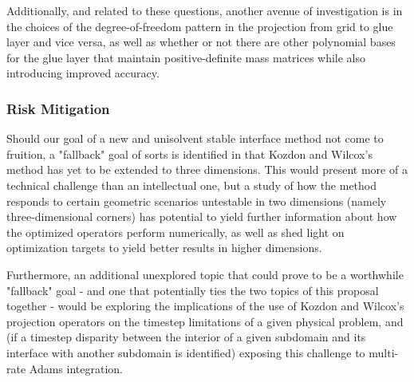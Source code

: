 Additionally, and related to these questions, another avenue of investigation
is in the choices of the degree-of-freedom pattern in the projection from
grid to glue layer and vice versa, as well as whether or not there are other
polynomial bases for the glue layer that maintain positive-definite mass
matrices while also introducing improved accuracy.

\subsubsection{Risk Mitigation}

Should our goal of a new and unisolvent stable interface method not come to
fruition, a "fallback" goal of sorts is identified in that Kozdon and Wilcox's
method has yet to be extended to three dimensions. This would present more of a
technical challenge than an intellectual one, but a study of how the method
responds to certain geometric scenarios untestable in two dimensions (namely
three-dimensional corners) has potential to yield further information about
how the optimized operators perform numerically, as well as shed light on
optimization targets to yield better results in higher dimensions.

Furthermore, an additional unexplored topic that could prove to be a worthwhile
"fallback" goal - and one that potentially ties the two topics of this proposal
together - would be exploring the implications of the use of Kozdon and Wilcox's
projection operators on the timestep limitations of a given physical problem, and
(if a timestep disparity between the interior of a given subdomain and its interface
with another subdomain is identified) exposing this challenge to multi-rate Adams
integration.

